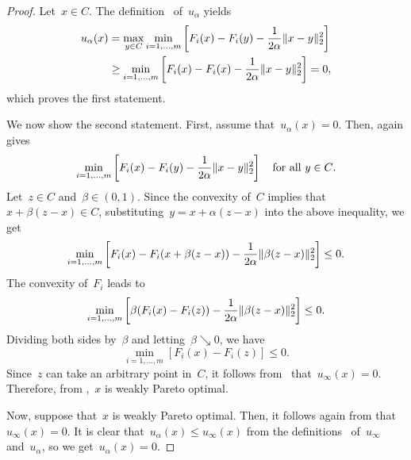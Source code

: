 \documentclass[../../main]{subfiles}
\begin{document}
\begin{proof}
    Let~$x \in C$.
    The definition~ of~$u_\alpha$ yields
    \begin{equation}
        \begin{split}
            u_\alpha(x) &= \max_{y \in C} \min_{i = 1, \dots, m} \left[ F_i(x) - F_i(y) - \frac{1}{2 \alpha} \lVert x - y\rVert_2^2 \right] \\
                      &\ge \min_{i = 1, \dots, m} \left[ F_i(x) - F_i(x) - \frac{1}{2 \alpha} \lVert x - y\rVert_2^2 \right] = 0
        ,\end{split}
    \end{equation} 
    which proves the first statement.

    We now show the second statement.
    First, assume that~$u_\alpha(x) = 0$.
    Then,  again gives
    \begin{equation}
        \min_{i = 1, \dots, m} \left[ F_i(x) - F_i(y) - \frac{1}{2 \alpha} \lVert x - y\rVert_2^2 \right] \quad \text{for all~$y \in C$}
    .\end{equation} 
    Let~$z \in C$ and~$\beta \in (0, 1)$.
    Since the convexity of~$C$ implies that~$x + \beta (z - x) \in C$, substituting~$y = x + \alpha (z - x)$ into the above inequality, we get
    \begin{equation}
        \min_{i = 1, \dots, m} \left[ F_i(x) - F_i(x + \beta (z - x)) - \frac{1}{2 \alpha} \lVert\beta (z - x)\rVert_2^2 \right] \le 0
    .\end{equation} 
    The convexity of~$F_i$ leads to
    \begin{equation}
        \min_{i = 1, \dots, m} \left[ \beta (F_i(x) - F_i(z)) - \frac{1}{2 \alpha} \lVert\beta (z - x)\rVert_2^2 \right] \le 0
    .\end{equation} 
    Dividing both sides by~$\beta$ and letting~$\beta \searrow 0$, we have
    \begin{equation}
        \min_{i = 1, \dots, m} [ F_i(x) - F_i(z) ] \le 0
    .\end{equation} 
    Since~$z$ can take an arbitrary point in~$C$, it follows from~ that~$u_\infty(x) = 0$.
    Therefore, from ,~$x$ is weakly Pareto optimal.

    Now, suppose that~$x$ is weakly Pareto optimal.
    Then, it follows again from  that~$u_\infty(x) = 0$.
    It is clear that~$u_\alpha(x) \le u_\infty(x)$ from the definitions~ of~$u_\infty$ and~$u_\alpha$, so we get~$u_\alpha(x) = 0$.
\end{proof}
\end{document}
